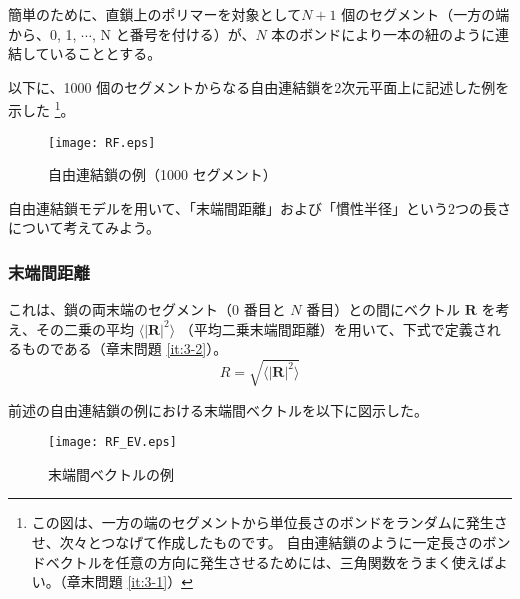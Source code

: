 \documentclass[a4paper,11pt]{jlreq}
\begin{document}
簡単のために、直鎖上のポリマーを対象として$N+1$ 個のセグメント（一方の端から、0, 1, $\cdots$, N と番号を付ける）が、$N$ 本のボンドにより一本の紐のように連結していることとする。

以下に、1000 個のセグメントからなる自由連結鎖を2次元平面上に記述した例を示した
\footnote
{
この図は、一方の端のセグメントから単位長さのボンドをランダムに発生させ、次々とつなげて作成したものです。
自由連結鎖のように一定長さのボンドベクトルを任意の方向に発生させるためには、三角関数をうまく使えばよい。（章末問題 \ref{it:3-1}）
}。
\begin{figure}[htb]
	\begin{center}
		\texttt{[image: RF.eps]}
		\caption{自由連結鎖の例（1000 セグメント）}
		\label{fig: RF}
	\end{center}
\end{figure}


自由連結鎖モデルを用いて、「末端間距離」および「慣性半径」という2つの長さについて考えてみよう。

\subsubsection{末端間距離}

これは、鎖の両末端のセグメント（0 番目と $N$ 番目）との間にベクトル $\bm{R}$ を考え、その二乗の平均 $\langle |\bm{R}|^2 \rangle$ （平均二乗末端間距離）を用いて、下式で定義されるものである（章末問題 \ref{it:3-2}）。
\begin{equation}
R=\sqrt{\langle |\bm{R}|^2 \rangle}
\end{equation}

前述の自由連結鎖の例における末端間ベクトルを以下に図示した。
\begin{figure}[htb]
	\begin{center}
		\texttt{[image: RF\_EV.eps]}
		\caption{末端間ベクトルの例}
		\label{fig: RF_EV}
	\end{center}
\end{figure}
\end{document}

